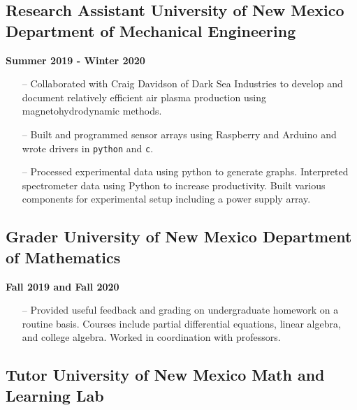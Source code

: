 \documentclass{article}
\begin{document}
\subsection*{Research Assistant \textbar{} University of New Mexico
Department of Mechanical
Engineering}\label{research-assistant-university-of-new-mexico-department-of-mechanical-engineering}

\textbf{Summer 2019 - Winter 2020}

\begin{itemize}
\tightlist
\item[--]
  Collaborated with Craig Davidson of Dark Sea Industries to develop and
  document relatively efficient air plasma production using
  magnetohydrodynamic methods.
\item[--]
  Built and programmed sensor arrays using Raspberry and Arduino and
  wrote drivers in \texttt{python} and \texttt{c}.
\item[--]
  Processed experimental data using python to generate graphs.
  Interpreted spectrometer data using Python to increase productivity.
  Built various components for experimental setup including a power
  supply array.
\end{itemize}

\subsection*{Grader \textbar{} University of New Mexico Department of
Mathematics}\label{grader-university-of-new-mexico-department-of-mathematics}

\textbf{Fall 2019 and Fall 2020}

\begin{itemize}
\tightlist
\item[--]
  Provided useful feedback and grading on undergraduate homework on a
  routine basis. Courses include partial differential equations, linear
  algebra, and college algebra. Worked in coordination with professors.
\end{itemize}

\subsection*{Tutor \textbar{} University of New Mexico Math and Learning
Lab}\label{tutor-university-of-new-mexico-math-and-learning-lab}
\end{document}

